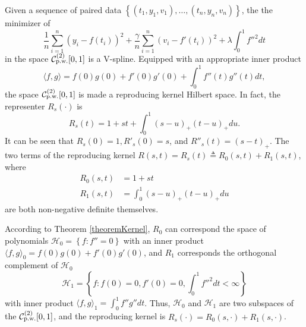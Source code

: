 Given a sequence of paired data $\left\lbrace (t_1,y_1,v_1),\ldots, (t_n,y_n,v_n) \right\rbrace$, the the minimizer of 
\begin{equation}\label{maineq}
\frac{1}{n}\sum_{i=1}^{n}(y_i-f(t_i))^2+\frac{\gamma}{n}\sum_{i=1}^{n}(v_i-f'(t_i))^2+\lambda \int_{0}^{1}f''^2dt
\end{equation}
in the space $\mathcal{C}_{\mbox{\scriptsize p.w.}}^{(2)}[0,1]$ is a V-spline. Equipped with an appropriate inner product
\begin{equation}\label{TractorSplineInnerProduct}
\langle f,g \rangle=f(0) g(0)+f'(0) g'(0)+\int_{0}^{1}f''(t)g''(t)dt,
\end{equation}
the space $\mathcal{C}_{\mbox{\scriptsize p.w.}}^{(2)}[0,1]$ is made a reproducing kernel Hilbert space. In fact, the representer $R_s(\cdot)$ is 
\begin{equation}\label{kerneleq}
R_s(t)=1+st+\int_{0}^{1} (s-u)_+(t-u)_+du.
\end{equation}
It can be seen that $R_s(0)=1, R'_s(0)=s$, and $R''_s(t)=(s-t)_+$. The two terms of the reproducing kernel $R(s,t)=R_s(t)\triangleq R_0(s,t)+R_1(s,t)$, where
\begin{align*} %
R_0(s,t)&=1+st \\ %
R_1(s,t)&=\int_{0}^{1} (s-u)_+(t-u)_+du
\end{align*}
are both non-negative definite themselves.


According to Theorem \ref{theoremKernel}, $R_0$ can correspond the space of polynomials $\mathcal{H}_0=\left\lbrace f:f''=0\right\rbrace$ with an inner product $\langle f,g \rangle_0= f(0)g(0)+f'(0)g'(0)$, and $R_1$ corresponds the orthogonal complement of $\mathcal{H}_0$
\begin{equation*}
\mathcal{H}_1=\left\lbrace f:f(0)=0, f'(0)=0, \int_{0}^{1}f''^2dt<\infty\right\rbrace
\end{equation*}
with inner product $\langle f,g \rangle_1=\int_{0}^{1}f''g''dt$. Thus, $\mathcal{H}_0$ and $\mathcal{H}_1$ are two subspaces of the $\mathcal{C}_{\mbox{\scriptsize p.w.}}^{(2)}[0,1]$, and the reproducing kernel is $R_s(\cdot) = R_0(s,\cdot)+R_1(s,\cdot)$.


